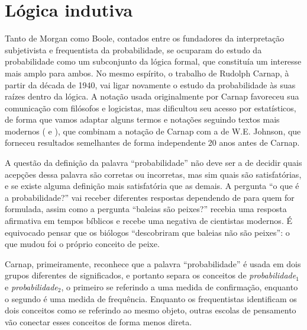 \section{Lógica indutiva}\label{sec:Carnap}

Tanto de Morgan como Boole, contados entre os fundadores da interpretação subjetivista e frequentista da probabilidade,
se ocuparam do estudo da probabilidade como um subconjunto da lógica formal, que constituía um interesse mais amplo para
ambos. No mesmo espírito, o trabalho de Rudolph Carnap, à partir da década de 1940, vai ligar novamente o estudo da probabilidade
às suas raízes dentro da lógica. A notação usada originalmente por Carnap favoreceu sua comunicação com filósofos e logicistas,
mas dificultou seu acesso por estatísticos, de forma que vamos adaptar alguns termos e notações seguindo textos mais
modernos (\citep{Zabell09} e \citep{Fitelson07}), que combinam a notação de Carnap com a de W.E. Johnson, que forneceu
resultados semelhantes de forma independente 20 anos antes de Carnap.

A questão da definição da palavra ``probabilidade'' não deve ser a de decidir quais acepções dessa palavra são
corretas ou incorretas, mas sim quais são satisfatórias, e se existe alguma definição mais satisfatória que as demais.
A pergunta ``o que é a probabilidade?''
vai receber diferentes respostas dependendo de para quem for formulada, assim como a pergunta ``baleias são peixes?''
recebia uma resposta afirmativa em tempos bíblicos e recebe uma negativa de cientistas modernos. É equivocado pensar que os
biólogos ``descobriram que baleias não são peixes'': o que mudou foi o próprio conceito de peixe. 

Carnap, primeiramente, reconhece que a palavra ``probabilidade'' é usada em
dois grupos diferentes de significados, e 
portanto separa os conceitos de {\em probabilidade$_1$} e {\em probabilidade$_2$}, o primeiro
se referindo a uma medida de confirmação, enquanto o segundo é uma medida de frequência.
Enquanto os frequentistas identificam os dois conceitos como se referindo ao mesmo objeto, outras escolas
de pensamento vão conectar esses conceitos de forma menos direta.

